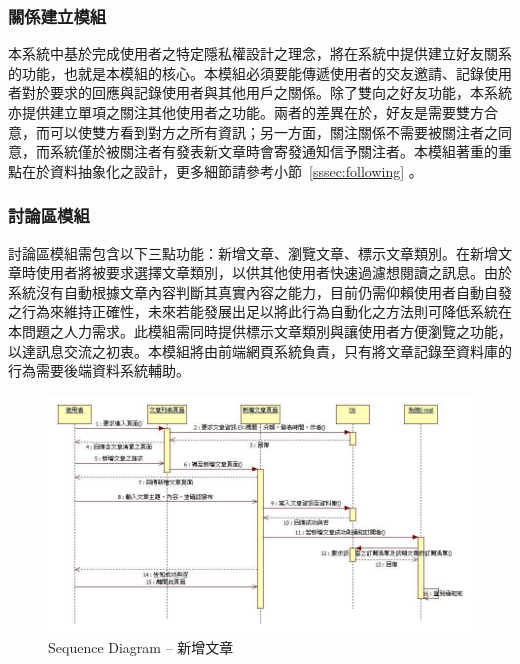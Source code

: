 \subsubsection{關係建立模組}

本系統中基於完成使用者之特定隱私權設計之理念，將在系統中提供建立好友關系的功能，也就是本模組的核心。本模組必須要能傳遞使用者的交友邀請、記錄使用者對於要求的回應與記錄使用者與其他用戶之關係。除了雙向之好友功能，本系統亦提供建立單項之關注其他使用者之功能。兩者的差異在於，好友是需要雙方合意，而可以使雙方看到對方之所有資訊；另一方面，關注關係不需要被關注者之同意，而系統僅於被關注者有發表新文章時會寄發通知信予關注者。本模組著重的重點在於資料抽象化之設計，更多細節請參考小節~\ref{sssec:following} 。

\subsubsection{討論區模組}
討論區模組需包含以下三點功能：新增文章、瀏覽文章、標示文章類別。在新增文章時使用者將被要求選擇文章類別，以供其他使用者快速過濾想閱讀之訊息。由於系統沒有自動根據文章內容判斷其真實內容之能力，目前仍需仰賴使用者自動自發之行為來維持正確性，未來若能發展出足以將此行為自動化之方法則可降低系統在本問題之人力需求。此模組需同時提供標示文章類別與讓使用者方便瀏覽之功能，以達訊息交流之初衷。本模組將由前端網頁系統負責，只有將文章記錄至資料庫的行為需要後端資料系統輔助。

\begin{figure}[H]
\centering
\includegraphics[width=1.05\textwidth]{img/useseq/stage2/seqNewArticle.jpg}
\caption{Sequence Diagram -- 新增文章}
\label{pic:seq:newArticle}
\end{figure}

